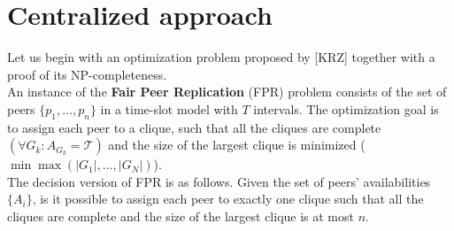 \documentclass{pracamgren}
\begin{document}
\section{Centralized approach}


Let us begin with an optimization problem proposed by [KRZ] together with a proof of its NP-completeness.\\

An instance of the {\bf Fair Peer Replication} (FPR) problem consists of the set of peers $\{p_1,\ldots,p_n\}$ in a time-slot model with $T$ intervals. The optimization goal is to assign each peer to a clique, such that all the cliques are complete $(\forall G_k:A_{G_k} = \mathcal{T})$ and the size of the largest clique is minimized ($\min\max(|G_1|,\ldots,|G_N|)$).\\

The decision version of FPR is as follows. Given the set of peers' availabilities $\{A_i\}$, is it possible to assign each peer to exactly one clique such that all the cliques are complete and the size of the largest clique is at most $n$.
\end{document}
